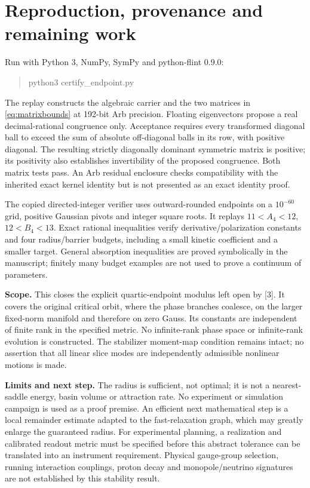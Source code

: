 \documentclass[11pt,a4paper]{article}
\begin{document}
\section{Reproduction, provenance and remaining work}
Run with Python 3, NumPy, SymPy and python-flint 0.9.0:
\begin{quote}\ttfamily python3 certify\_endpoint.py\end{quote}
The replay constructs the algebraic carrier and the two matrices in \eqref{eq:matrixbounds} at 192-bit Arb precision. Floating eigenvectors propose a real decimal-rational congruence only. Acceptance requires every transformed diagonal ball to exceed the sum of absolute off-diagonal balls in its row, with positive diagonal. The resulting strictly diagonally dominant symmetric matrix is positive; its positivity also establishes invertibility of the proposed congruence. Both matrix tests pass. An Arb residual enclosure checks compatibility with the inherited exact kernel identity but is not presented as an exact identity proof.

The copied directed-integer verifier uses outward-rounded endpoints on a $10^{-60}$ grid, positive Gaussian pivots and integer square roots. It replays $11<A_4<12$, $12<B_4<13$. Exact rational inequalities verify derivative/polarization constants and four radius/barrier budgets, including a small kinetic coefficient and a smaller target. General absorption inequalities are proved symbolically in the manuscript; finitely many budget examples are not used to prove a continuum of parameters.

\textbf{Scope.} This closes the explicit quartic-endpoint modulus left open by [3]. It covers the original critical orbit, where the phase branches coalesce, on the larger fixed-norm manifold and therefore on zero Gauss. Its constants are independent of finite rank in the specified metric. No infinite-rank phase space or infinite-rank evolution is constructed. The stabilizer moment-map condition remains intact; no assertion that all linear slice modes are independently admissible nonlinear motions is made.

\textbf{Limits and next step.} The radius is sufficient, not optimal; it is not a nearest-saddle energy, basin volume or attraction rate. No experiment or simulation campaign is used as a proof premise. An efficient next mathematical step is a local remainder estimate adapted to the fast-relaxation graph, which may greatly enlarge the guaranteed radius. For experimental planning, a realization and calibrated readout metric must be specified before this abstract tolerance can be translated into an instrument requirement. Physical gauge-group selection, running interaction couplings, proton decay and monopole/neutrino signatures are not established by this stability result.
\end{document}
